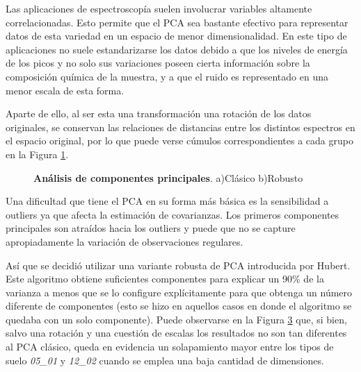 \documentclass[12pt]{article}
\begin{document}
Las aplicaciones de espectroscopía suelen involucrar variables altamente correlacionadas. Esto permite que el PCA sea bastante efectivo para representar datos de esta variedad en un espacio de menor dimensionalidad. En este tipo de aplicaciones no suele estandarizarse los datos debido a que los niveles de energía de los picos y no solo sus variaciones poseen cierta información sobre la composición química de la muestra, y a que el ruido es representado en una menor escala de esta forma.

Aparte de ello, al ser esta una transformación una rotación de los datos originales, se conservan las relaciones de distancias entre los distintos espectros en el espacio original, por lo que puede verse cúmulos correspondientes a cada grupo en la Figura \ref{fig:pca}.

\begin{figure}[htbp]
    \centering
    \begin{subfigure}[b]{0.9\textwidth}
        \caption{}
        
        \label{fig:pca}
    \end{subfigure}
    \begin{subfigure}[b]{0.9\textwidth}
        \caption{}
        
        \label{fig:pcab}
    \end{subfigure}
    \caption{\textbf{Análisis de componentes principales}. a)Clásico b)Robusto}    
\end{figure}

Una dificultad que tiene el PCA en su forma más básica es la sensibilidad a outliers ya que afecta la estimación de covarianzas. Los primeros componentes principales son atraídos hacia los outliers y puede que no se capture apropiadamente la variación de observaciones regulares\cite{Hubert2005}.

Así que se decidió utilizar una variante robusta de PCA introducida por Hubert\cite{Hubert2005}. Este algoritmo obtiene suficientes componentes para explicar un 90\% de la varianza a menos que se lo configure explícitamente para que obtenga un número diferente de componentes (esto se hizo en aquellos casos en donde el algoritmo se quedaba con un solo componente). Puede observarse en la Figura \ref{fig:pcab} que, si bien, salvo una rotación y una cuestión de escalas los resultados no son tan diferentes al PCA clásico, queda en evidencia un solapamiento mayor entre los tipos de suelo \textit{05\_01} y \textit{12\_02} cuando se emplea una baja cantidad de dimensiones.
\end{document}
